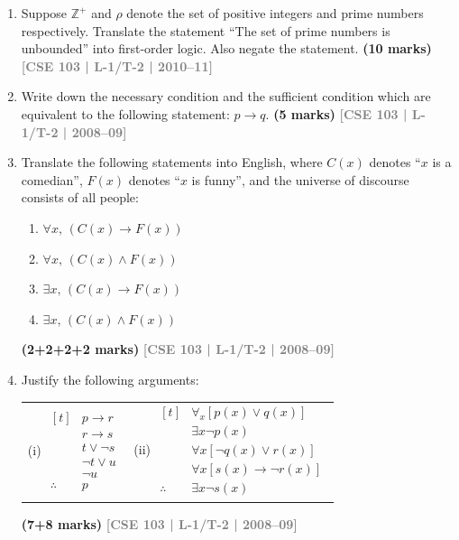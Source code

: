 \documentclass[12pt,a3paper]{article}
\newcommand{\yr}[1]{\hfill\textcolor{gray}{\small\textbf{[#1]}}}
\newcommand{\mk}[1]{\textcolor{orange!70!black}{\small\textbf{(#1 marks)}}}
\begin{document}
\begin{enumerate}
\item Suppose $\mathbb{Z}^+$ and $\rho$ denote the set of positive integers and prime numbers respectively. Translate the statement ``The set of prime numbers is unbounded'' into first-order logic. Also negate the statement.
\mk{10} \yr{CSE 103 | L-1/T-2 | 2010--11}

\item Write down the necessary condition and the sufficient condition which are equivalent to the following statement: $p \to q$.
\mk{5} \yr{CSE 103 | L-1/T-2 | 2008--09}

\item Translate the following statements into English, where $C(x)$ denotes ``$x$ is a comedian'', $F(x)$ denotes ``$x$ is funny'', and the universe of discourse consists of all people:
\begin{enumerate}
  \item $\forall x,\, (C(x) \to F(x))$
  \item $\forall x,\, (C(x) \land F(x))$
  \item $\exists x,\, (C(x) \to F(x))$
  \item $\exists x,\, (C(x) \land F(x))$
\end{enumerate}
\mk{2+2+2+2} \yr{CSE 103 | L-1/T-2 | 2008--09}

\item Justify the following arguments:
\begin{center}
  \begin{tabular}{ll}
(i) \quad 
$\begin{aligned}[t]
    & p \rightarrow r \\
    & r \rightarrow s \\
    & t \lor \neg s \\
    & \neg t \lor u \\
    & \neg u \\
    \hline
    \therefore \quad & p
\end{aligned}$ 
& \qquad \qquad (ii) \quad 
$\begin{aligned}[t]
    & \forall_x [p(x) \lor q(x)] \\
    & \exists x \neg p(x) \\
    & \forall x [\neg q(x) \lor r(x)] \\
    & \forall x [s(x) \rightarrow \neg r(x)] \\
    \hline
    \therefore \quad & \exists x \neg s(x)
\end{aligned}$
\end{tabular}
\end{center}
\mk{7+8} \yr{CSE 103 | L-1/T-2 | 2008--09}


\end{enumerate}
\end{document}
